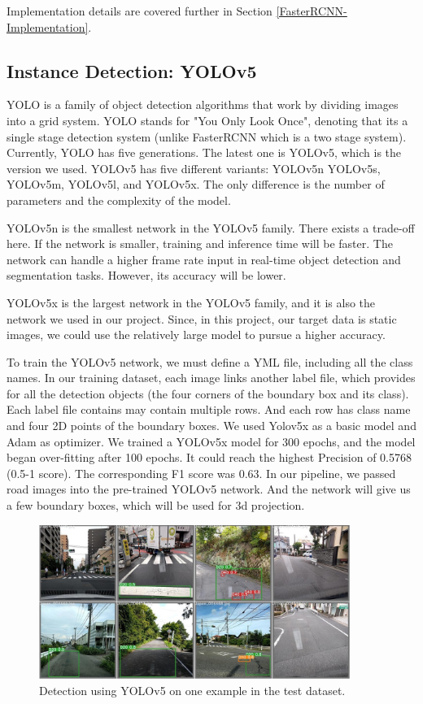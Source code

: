 \documentclass{article}
\begin{document}
Implementation details are covered further in Section \ref{FasterRCNN-Implementation}.

\subsection{Instance Detection: YOLOv5}
YOLO is a family of object detection algorithms that work by dividing images into a grid system. YOLO stands for "You Only Look Once", denoting that its a single stage detection system (unlike FasterRCNN which is a two stage system). Currently, YOLO has five generations. The latest one is YOLOv5, which is the version we used. YOLOv5 has five different variants: YOLOv5n YOLOv5s, YOLOv5m, YOLOv5l, and YOLOv5x. The only difference is the number of parameters and the complexity of the model. 

YOLOv5n is the smallest network in the YOLOv5 family. There exists a trade-off here. If the network is smaller, training and inference time will be faster. The network can handle a higher frame rate input in real-time object detection and segmentation tasks. However, its accuracy will be lower.

YOLOv5x is the largest network in the YOLOv5 family, and it is also the network we used in our project. Since, in this project, our target data is static images, we could use the relatively large model to pursue a higher accuracy. 

To train the YOLOv5 network, we must define a YML file, including all the class names. In our training dataset, each image links another label file, which provides for all the detection objects (the four corners of the boundary box and its class). Each label file contains may contain multiple rows. And each row has class name and four 2D points of the boundary boxes. We used Yolov5x as a basic model and Adam as optimizer. We trained a YOLOv5x model for 300 epochs, and the model began over-fitting after 100 epochs. It could reach the highest Precision of 0.5768 (0.5-1 score). The corresponding F1 score was 0.63. In our pipeline, we passed road images into the pre-trained YOLOv5 network. And the network will give us a few boundary boxes, which will be used for 3d projection. 
\begin{figure}[h!]
\centering
\includegraphics[width=0.9\textwidth]{images/test_batch0_pred (2).jpg}
\caption{Detection using YOLOv5 on one example in the test dataset.}
\label{fig:sample0}
\end{figure}
\end{document}
